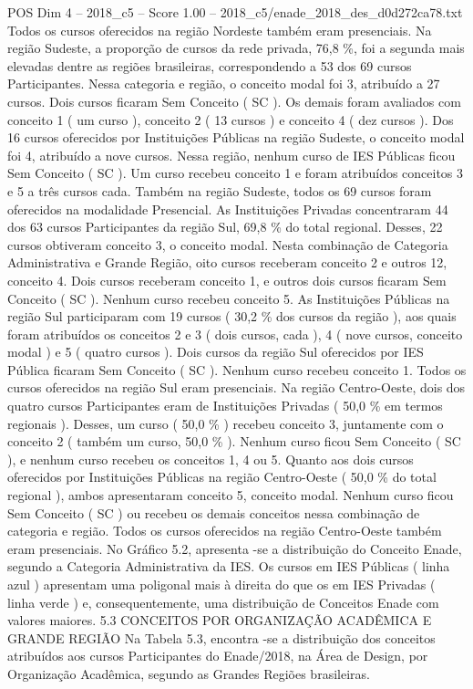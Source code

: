 \begin{textsample}{POS Dim 4 – 2018\_c5 – Score 1.00 – 2018\_c5/enade\_2018\_des\_d0d272ca78.txt}
Todos os cursos oferecidos na região Nordeste também eram presenciais.
Na região Sudeste, a proporção de cursos da rede privada, 76,8 \%, foi a segunda mais elevadas dentre as regiões brasileiras, correspondendo a 53 dos 69 cursos Participantes.
Nessa categoria e região, o conceito modal foi 3, atribuído a 27 cursos.
Dois cursos ficaram Sem Conceito ( SC ).
Os demais foram avaliados com conceito 1 ( um curso ), conceito 2 ( 13 cursos ) e conceito 4 ( dez cursos ).
Dos 16 cursos oferecidos por Instituições Públicas na região Sudeste, o conceito modal foi 4, atribuído a nove cursos.
Nessa região, nenhum curso de IES Públicas ficou Sem Conceito ( SC ).
Um curso recebeu conceito 1 e foram atribuídos conceitos 3 e 5 a três cursos cada.
Também na região Sudeste, todos os 69 cursos foram oferecidos na modalidade Presencial.
As Instituições Privadas concentraram 44 dos 63 cursos Participantes da região Sul, 69,8 \% do total regional.
Desses, 22 cursos obtiveram conceito 3, o conceito modal.
Nesta combinação de Categoria Administrativa e Grande Região, oito cursos receberam conceito 2 e outros 12, conceito 4.
Dois cursos receberam conceito 1, e outros dois cursos ficaram Sem Conceito ( SC ).
Nenhum curso recebeu conceito 5.
As Instituições Públicas na região Sul participaram com 19 cursos ( 30,2 \% dos cursos da região ), aos quais foram atribuídos os conceitos 2 e 3 ( dois cursos, cada ), 4 ( nove cursos, conceito modal ) e 5 ( quatro cursos ).
Dois cursos da região Sul oferecidos por IES Pública ficaram Sem Conceito ( SC ).
Nenhum curso recebeu conceito 1.
Todos os cursos oferecidos na região Sul eram presenciais.
Na região Centro-Oeste, dois dos quatro cursos Participantes eram de Instituições Privadas ( 50,0 \% em termos regionais ).
Desses, um curso ( 50,0 \% ) recebeu conceito 3, juntamente com o conceito 2 ( também um curso, 50,0 \% ).
Nenhum curso ficou Sem Conceito ( SC ), e nenhum curso recebeu os conceitos 1, 4 ou 5.
Quanto aos dois cursos oferecidos por Instituições Públicas na região Centro-Oeste ( 50,0 \% do total regional ), ambos apresentaram conceito 5, conceito modal.
Nenhum curso ficou Sem Conceito ( SC ) ou recebeu os demais conceitos nessa combinação de categoria e região.
Todos os cursos oferecidos na região Centro-Oeste também eram presenciais.
No Gráfico 5.2, apresenta -se a distribuição do Conceito Enade, segundo a Categoria Administrativa da IES.
Os cursos em IES Públicas ( linha azul ) apresentam uma poligonal mais à direita do que os em IES Privadas ( linha verde ) e, consequentemente, uma distribuição de Conceitos Enade com valores maiores. 5.3 CONCEITOS POR ORGANIZAÇÃO ACADÊMICA E GRANDE REGIÃO Na Tabela 5.3, encontra -se a distribuição dos conceitos atribuídos aos cursos Participantes do Enade/2018, na Área de Design, por Organização Acadêmica, segundo as Grandes Regiões brasileiras.

\end{textsample}
